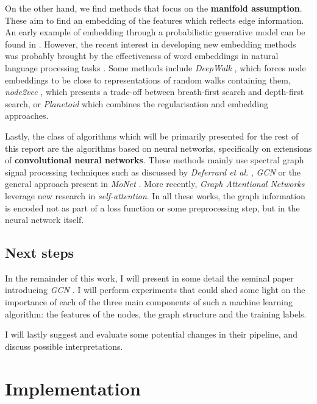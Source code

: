 \documentclass[10pt,a4]{article}
\begin{document}
    On the other hand, we find methods that focus on the \textbf{manifold assumption}. 
    These aim to find an embedding of the features which reflects edge information. 
    An early example of embedding through a probabilistic generative model can be 
    found in \cite{nowicki2001estimation}. However, the recent interest in developing new
    embedding methods was probably brought by the effectiveness of word embeddings 
    in natural language processing tasks \cite{mikolov2013distributed}. Some methods include
    \emph{DeepWalk} \cite{perozzi2014deepwalk}, which forces node embeddings to be close to 
    representations of random walks containing them, \emph{node2vec} \cite{grover2016node2vec}, 
    which presents a trade-off between breath-first search and depth-first search, 
    or \emph{Planetoid} \cite{yang2016revisiting} which combines the regularisation 
    and embedding approaches.
    
    Lastly, the class of algorithms which will be primarily presented for the 
    rest of this report are the algorithms based on neural networks, specifically 
    on extensions of \textbf{convolutional neural networks}. These methods mainly use 
    spectral graph signal processing techniques such as discussed by \emph{Deferrard et al.} 
    \cite{defferrard2016convolutional}, \emph{GCN} \cite{kipf2016semi} or the 
    general approach present in \emph{MoNet} \cite{monti2017geometric}. More recently, 
    \emph{Graph Attentional Networks} \cite{velivckovic2017graph} leverage new
    research in \emph{self-attention}. 
    In all these works, the graph information is encoded not as part of a loss 
    function or some preprocessing step, but in the neural network itself.  
    
    \subsection{Next steps}

    In the remainder of this work, I will present in some detail the seminal 
    paper introducing \emph{GCN} \cite{kipf2016semi}. I will perform experiments
    that could shed some light on the importance of each of the three main 
    components of such a machine learning algorithm: the features of the nodes,
    the graph structure and the training labels. 
    
    I will lastly suggest and evaluate some potential changes in their pipeline, 
    and discuss possible interpretations.
    
    \section{Implementation} \label{impl}
    
\end{document}
